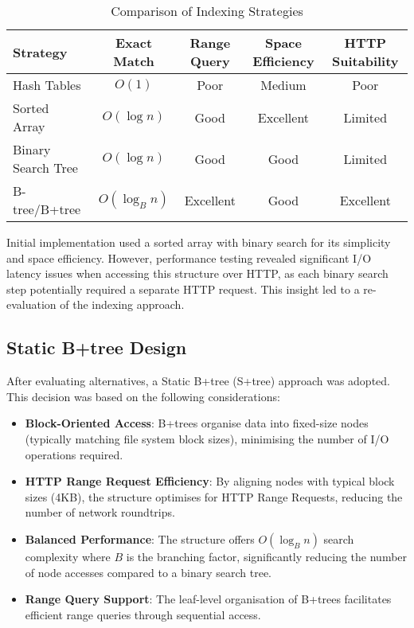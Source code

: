 \begin{table}[ht]
    \centering
    \caption{Comparison of Indexing Strategies}
    \begin{tabular}{l|c|c|c|c}
        \hline
        \textbf{Strategy} & \textbf{Exact Match} & \textbf{Range Query} & \textbf{Space Efficiency} & \textbf{HTTP Suitability} \\
        \hline
        Hash Tables & $O(1)$ & Poor & Medium & Poor \\
        Sorted Array & $O(\log n)$ & Good & Excellent & Limited \\
        Binary Search Tree & $O(\log n)$ & Good & Good & Limited \\
        B-tree/B+tree & $O(\log_B n)$ & Excellent & Good & Excellent \\
        \hline
    \end{tabular}
    \label{tab:indexing_strategies}
\end{table}

Initial implementation used a sorted array with binary search for its simplicity and space efficiency. However, performance testing revealed significant I/O latency issues when accessing this structure over HTTP, as each binary search step potentially required a separate HTTP request. This insight led to a re-evaluation of the indexing approach.

\subsection{Static B+tree Design}
\label{subsec:static_btree_design}

After evaluating alternatives, a Static B+tree (S+tree) approach was adopted. This decision was based on the following considerations:

\begin{itemize}
    \item \textbf{Block-Oriented Access}: B+trees organise data into fixed-size nodes (typically matching file system block sizes), minimising the number of I/O operations required.
    \item \textbf{HTTP Range Request Efficiency}: By aligning nodes with typical block sizes (4KB), the structure optimises for HTTP Range Requests, reducing the number of network roundtrips.
    \item \textbf{Balanced Performance}: The structure offers $O(\log_B n)$ search complexity where $B$ is the branching factor, significantly reducing the number of node accesses compared to a binary search tree.
    \item \textbf{Range Query Support}: The leaf-level organisation of B+trees facilitates efficient range queries through sequential access.
\end{itemize}

